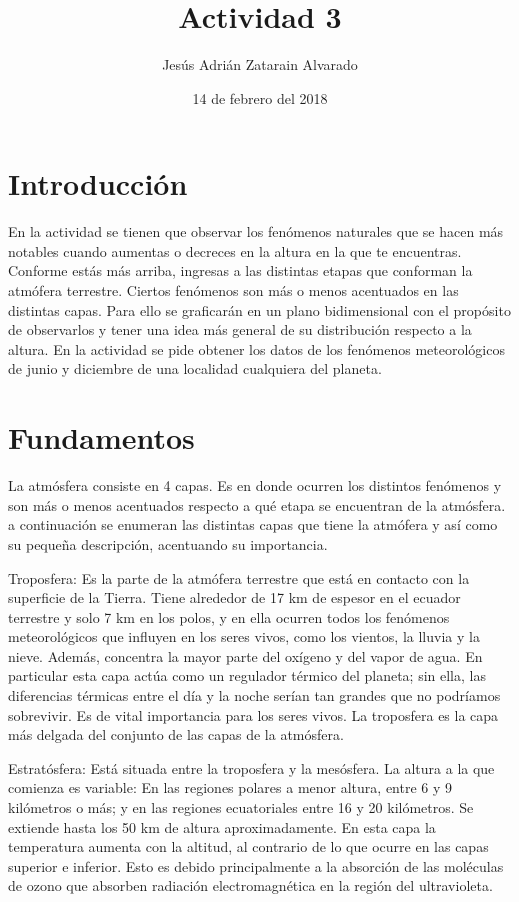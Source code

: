 \documentclass{article}
\title{Actividad 3}
\author{Jesús Adrián Zatarain Alvarado}
\date{14 de febrero del 2018}
\begin{document}
\maketitle

\section{Introducción}

En la actividad se tienen que observar los fenómenos naturales que se hacen más notables cuando aumentas o decreces en la altura en la que te encuentras. Conforme estás más arriba, ingresas a las distintas etapas que conforman la atmófera terrestre. Ciertos fenómenos son más o menos acentuados en las distintas capas. Para ello se graficarán en un plano bidimensional con el propósito de observarlos y tener una idea más general de su distribución respecto a la altura.
En la actividad se pide obtener los datos de los fenómenos meteorológicos de junio y diciembre de una localidad cualquiera del planeta.

\section{Fundamentos}

La atmósfera consiste en 4 capas. Es en donde ocurren los distintos fenómenos y son más o menos acentuados respecto a qué etapa se encuentran de la atmósfera. a continuación se enumeran las distintas capas que tiene la atmófera y así como su pequeña descripción, acentuando su importancia.

\itemize

\item Troposfera: Es la parte de la atmófera terrestre que está en contacto con la superficie de la Tierra. Tiene alrededor de 17 km de espesor en el ecuador terrestre y solo 7 km en los polos, y en ella ocurren todos los fenómenos meteorológicos que influyen en los seres vivos, como los vientos, la lluvia y la nieve. Además, concentra la mayor parte del oxígeno y del vapor de agua. En particular esta capa actúa como un regulador térmico del planeta; sin ella, las diferencias térmicas entre el día y la noche serían tan grandes que no podríamos sobrevivir. Es de vital importancia para los seres vivos. La troposfera es la capa más delgada del conjunto de las capas de la atmósfera.

\item Estratósfera: Está situada entre la troposfera y la mesósfera. La altura a la que comienza es variable: En las regiones polares a menor altura, entre 6 y 9 kilómetros o más; y en las regiones ecuatoriales entre 16 y 20 kilómetros. Se extiende hasta los 50 km de altura aproximadamente. En esta capa la temperatura aumenta con la altitud, al contrario de lo que ocurre en las capas superior e inferior. Esto es debido principalmente a la absorción de las moléculas de ozono que absorben radiación electromagnética en la región del ultravioleta.
\end{document}

